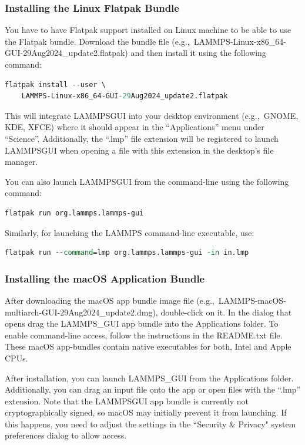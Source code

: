 \documentclass[9pt,tutorial]{livecoms}
\newcommand{\lammpsgui}{\textsf{LAMMPS\textendash GUI}}
\begin{document}
\begin{appendices}
\subsubsection{Installing the Linux Flatpak Bundle}

You have to have Flatpak support installed on Linux machine to be able
to use the Flatpak bundle.  Download the bundle file
(e.g.,~LAMMPS-Linux-x86\_64-GUI-29Aug2024\_update2.flatpak) and then
install it using the following command:
\begin{lstlisting}[language=tcl]
flatpak install --user \
    LAMMPS-Linux-x86_64-GUI-29Aug2024_update2.flatpak
\end{lstlisting}
This will integrate \lammpsgui{} into your desktop environment
(e.g.,~GNOME, KDE, XFCE) where it should appear in the ``Applications''
menu under ``Science''.  Additionally, the ``.lmp'' file extension will be
registered to launch \lammpsgui{} when opening a file with this
extension in the desktop's file manager.

You can also launch \lammpsgui{} from the command-line using the following command:
\begin{lstlisting}[language=tcl]
flatpak run org.lammps.lammps-gui
\end{lstlisting}
Similarly, for launching the LAMMPS command-line executable, use:
\begin{lstlisting}[language=tcl]
flatpak run --command=lmp org.lammps.lammps-gui -in in.lmp
\end{lstlisting}

\subsubsection{Installing the macOS Application Bundle}

After downloading the macOS app bundle image file
(e.g.,~LAMMPS-macOS-multiarch-GUI-29Aug2024\_update2.dmg), double-click
on it.  In the dialog that opens drag the LAMMPS\_GUI app bundle into
the Applications folder.  To enable command-line access, follow the
instructions in the README.txt file.  These macOS app-bundles contain
native executables for both, Intel and Apple CPUs.

After installation, you can launch LAMMPS\_GUI from the Applications
folder.  Additionally, you can drag an input file onto the app or open
files with the ``.lmp'' extension.  Note that the \lammpsgui{} app bundle is
currently not cryptographically signed, so macOS may initially prevent
it from launching.  If this happens, you need to adjust the settings in
the ``Security \& Privacy" system preferences dialog to allow access.


\end{appendices}
\end{document}
